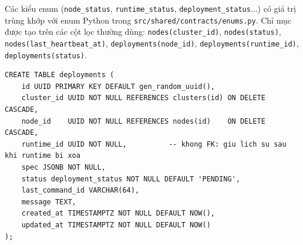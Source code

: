 Các kiểu enum (\texttt{node\_status}, \texttt{runtime\_status},
\texttt{deployment\_status}...) có giá trị trùng khớp với enum Python trong
\texttt{src/shared/contracts/enums.py}. Chỉ mục được tạo trên các cột lọc thường
dùng: \texttt{nodes(cluster\_id)}, \texttt{nodes(status)},
\texttt{nodes(last\_heartbeat\_at)}, \texttt{deployments(node\_id)},
\texttt{deployments(runtime\_id)}, \texttt{deployments(status)}.

\begin{lstlisting}[caption={Bảng deployments (V002)}]
CREATE TABLE deployments (
    id UUID PRIMARY KEY DEFAULT gen_random_uuid(),
    cluster_id UUID NOT NULL REFERENCES clusters(id) ON DELETE CASCADE,
    node_id    UUID NOT NULL REFERENCES nodes(id)    ON DELETE CASCADE,
    runtime_id UUID NOT NULL,          -- khong FK: giu lich su sau khi runtime bi xoa
    spec JSONB NOT NULL,
    status deployment_status NOT NULL DEFAULT 'PENDING',
    last_command_id VARCHAR(64),
    message TEXT,
    created_at TIMESTAMPTZ NOT NULL DEFAULT NOW(),
    updated_at TIMESTAMPTZ NOT NULL DEFAULT NOW()
);
\end{lstlisting}
